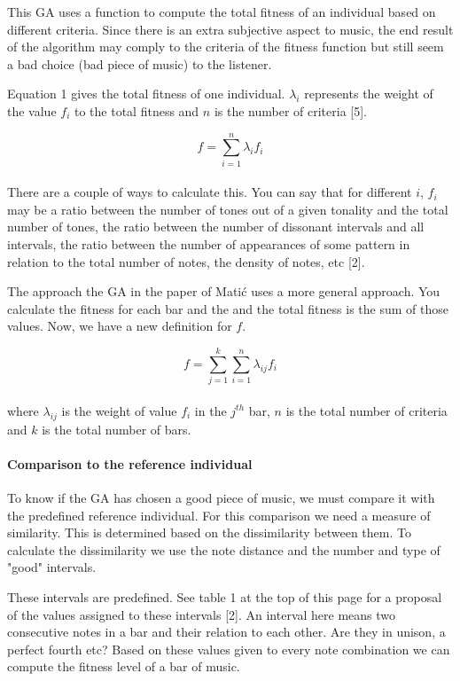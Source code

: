 \documentclass[12pt]{article}
\begin{document}
This GA uses a function to compute the total fitness of an individual based on different criteria. Since there is an extra subjective aspect to music, the end result of the algorithm may comply to the criteria of the fitness function but still seem a bad choice (bad piece of music) to the listener. 
\newline

Equation 1 gives the total fitness of one individual. $\lambda_i$ represents the weight of the value $f_i$ to the total fitness and $n$ is the number of criteria [5].

\begin{equation}
f = \sum_{i = 1}^{n}\lambda_i f_i
\end{equation}
\\
There are a couple of ways to calculate this. You can say that for different $i$, $f_i$ may be a ratio between the number of tones out of a given tonality and the total number of tones, the ratio between the number of dissonant intervals and all intervals, the ratio between the number of appearances of some pattern in relation to the total number of notes, the density of notes, etc [2]. 
\newpage

The approach the GA in the paper of Mati\'c uses a more general approach. You calculate the fitness for each bar and the and the total fitness is the sum of those values. Now, we have a new definition for $f$.

\begin{equation}
f = \sum_{j = 1}^{k} \sum_{i = 1}^{n}\lambda_{ij} f_i
\end{equation}
\\
where $\lambda_{ij}$ is the weight of value $f_i$ in the $j^{th}$ bar, $n$ is the total number of criteria and $k$ is the total number of bars.

\paragraph{Comparison to the reference individual}

To know if the GA has chosen a good piece of music, we must compare it with the predefined reference individual. For this comparison we need a measure of similarity. This is determined based on the dissimilarity between them. To calculate the dissimilarity we use the note distance and the number and type of "good" intervals.
\newline

These intervals are predefined. See table 1 at the top of this page for a proposal of the values assigned to these intervals [2]. An interval here means two consecutive notes in a bar and their relation to each other. Are they in unison, a perfect fourth etc? Based on these values given to every note combination we can compute the fitness level of a bar of music.
\end{document}
